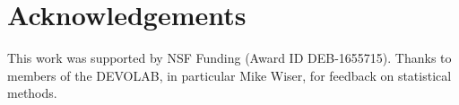 \section{Acknowledgements}

This work was supported by NSF Funding (Award ID DEB-1655715).
Thanks to members of the DEVOLAB, in particular Mike Wiser, for feedback on statistical methods.
